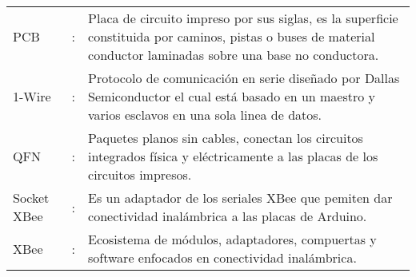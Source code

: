 \begin{tabular}{lcp{10.5cm}}
PCB &:& Placa de circuito impreso por sus siglas, es la superficie constituida por caminos, pistas o buses de material conductor laminadas sobre una base no conductora.\\

1-Wire  &:& Protocolo de comunicación en serie diseñado por Dallas Semiconductor el cual está basado en un maestro y varios esclavos en una sola linea de datos.\\

QFN &:& Paquetes planos sin cables, conectan los circuitos integrados física y eléctricamente a las placas de los circuitos impresos.\\

Socket XBee &:& Es un adaptador de los seriales XBee que pemiten dar conectividad inalámbrica a las placas de Arduino.\\

XBee &:& Ecosistema de módulos, adaptadores, compuertas y software enfocados en conectividad inalámbrica.\\

\end{tabular}
